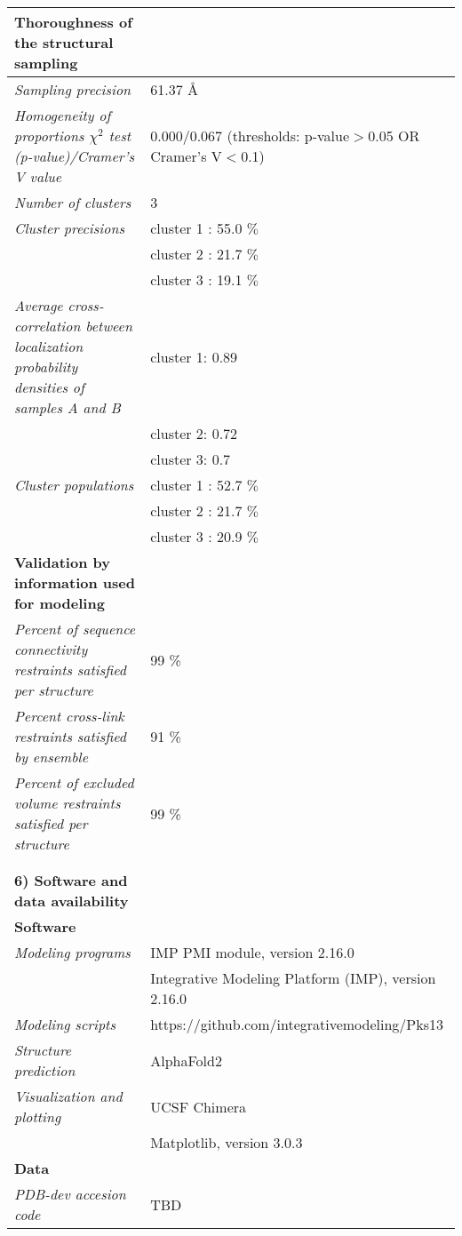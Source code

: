 \documentclass[8pt,a4paper]{article}
\begin{document}
\begin{longtable}{ p{} | p{} }
    \textbf{Thoroughness of the structural sampling} & \\
    \hline
          \textit{Sampling precision} & 61.37 \AA \\
                \textit{Homogeneity of proportions $\chi^2$ test (p-value)/Cramer’s V value} & 0.000/0.067 (thresholds: p-value$>$0.05 OR Cramer's V$<$0.1)\\
                \textit{Number of clusters} & 3\\
                \textit{Cluster precisions} & cluster 1 : 55.0 $\%$\\
            & cluster 2 : 21.7 $\%$ \\
            & cluster 3 : 19.1 $\%$ \\
                \textit{Average cross-correlation between localization probability densities of samples A and B} & cluster 1: 0.89\\
            & cluster 2: 0.72 \\
            & cluster 3: 0.7 \\
                \textit{Cluster populations} & cluster 1 : 52.7 $\%$\\
            & cluster 2 : 21.7 $\%$ \\
            & cluster 3 : 20.9 $\%$ \\
           \hline
  
  \textbf{Validation by information used for modeling} & \\
  \hline
          \textit{Percent of sequence connectivity restraints satisfied per structure} & 99 \%\\
                \textit{Percent cross-link restraints satisfied by ensemble} & 91 \%\\
                \textit{Percent of excluded volume restraints satisfied per structure} & 99 \%\\
          &  \\
  
   &  \\
  \normalsize{\textbf{6) Software and data availability}} & \\
    \hline
   \textbf{Software} & \\
   \hline
             \textit{Modeling programs} & IMP PMI module, version 2.16.0\\
             & Integrative Modeling Platform (IMP), version 2.16.0 \\
                  \textit{Modeling scripts} & https://github.com/integrativemodeling/Pks13\\
                  \textit{Structure prediction} & AlphaFold2\\
                  \textit{Visualization and plotting} & UCSF Chimera\\
             & Matplotlib, version 3.0.3  \\
          \hline

  \textbf{Data} & \\
    \hline
            \textit{PDB-dev accesion code} & TBD\\
          \hline
  
\end{longtable}
\end{document}
